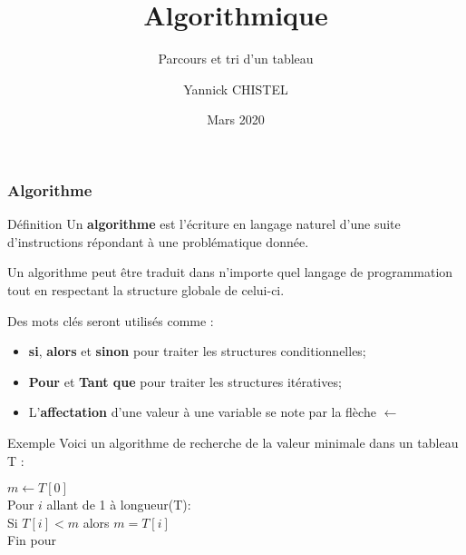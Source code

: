 \documentclass[9pt]{beamer}
\title{Algorithmique}
\subtitle{Parcours et tri d'un tableau}
\author{Yannick CHISTEL}
\institute{Lycée Dumont d'Urville - CAEN}
\date{Mars 2020}
\newcommand{\esp}{\hspace{0.5cm}}
\begin{document}
 
\frame{\titlepage}

\begin{frame}
\frametitle{Algorithme}

\begin{block}{Définition}
Un \textbf{algorithme} est l'écriture en langage naturel d'une suite d'instructions répondant à une problématique donnée.

Un algorithme peut être traduit dans n'importe quel langage de programmation tout en respectant la structure globale de celui-ci.

Des mots clés seront utilisés comme : 
\begin{itemize}
\item \textbf{si}, \textbf{alors} et \textbf{sinon} pour traiter les structures conditionnelles;
\item \textbf{Pour} et \textbf{Tant que} pour traiter les structures itératives;
\item L'\textbf{affectation} d'une valeur à une variable se note par la flèche $\longleftarrow$
\end{itemize}
\end{block}

\begin{exampleblock}{Exemple}
Voici un algorithme de recherche de la valeur minimale dans un tableau T :\medskip

$m \longleftarrow T[0]$\\
Pour $i$ allant de 1 à longueur(T):\\
\esp Si $T[i]<m$ alors $m=T[i]$\\
Fin pour
\end{exampleblock}

\end{frame}
\end{document}
